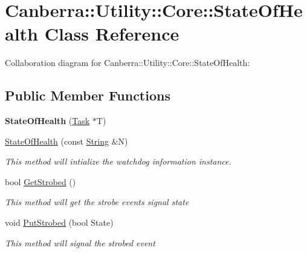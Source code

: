 \hypertarget{class_canberra_1_1_utility_1_1_core_1_1_state_of_health}{}\section{Canberra\+:\+:Utility\+:\+:Core\+:\+:State\+Of\+Health Class Reference}
\label{class_canberra_1_1_utility_1_1_core_1_1_state_of_health}


Collaboration diagram for Canberra\+:\+:Utility\+:\+:Core\+:\+:State\+Of\+Health\+:
\subsection*{Public Member Functions}
\begin{DoxyCompactItemize}
\item 
\mbox{\label{class_canberra_1_1_utility_1_1_core_1_1_state_of_health_a9314518256957a39de6ee134bd101fd0}} 
{\bfseries State\+Of\+Health} (\hyperlink{class_canberra_1_1_utility_1_1_core_1_1_task}{Task} $\ast$T)
\item 
\hyperlink{class_canberra_1_1_utility_1_1_core_1_1_state_of_health_adbb3e21233f1821db0bede0aa822bcf8_adbb3e21233f1821db0bede0aa822bcf8}{State\+Of\+Health} (const \hyperlink{class_canberra_1_1_utility_1_1_core_1_1_string}{String} \&N)
\begin{DoxyCompactList}\small\item\em This method will intialize the watchdog information instance. \end{DoxyCompactList}\item 
bool \hyperlink{class_canberra_1_1_utility_1_1_core_1_1_state_of_health_a7cb904e2fe8ecb7ff16760a0abb9da46_a7cb904e2fe8ecb7ff16760a0abb9da46}{Get\+Strobed} ()
\begin{DoxyCompactList}\small\item\em This method will get the strobe events signal state \end{DoxyCompactList}\item 
void \hyperlink{class_canberra_1_1_utility_1_1_core_1_1_state_of_health_a9c16550a6f35cbf8d96bb4e1c88c15cd_a9c16550a6f35cbf8d96bb4e1c88c15cd}{Put\+Strobed} (bool State)
\begin{DoxyCompactList}\small\item\em This method will signal the strobed event \end{DoxyCompactList}\item 

\end{DoxyCompactItemize}
